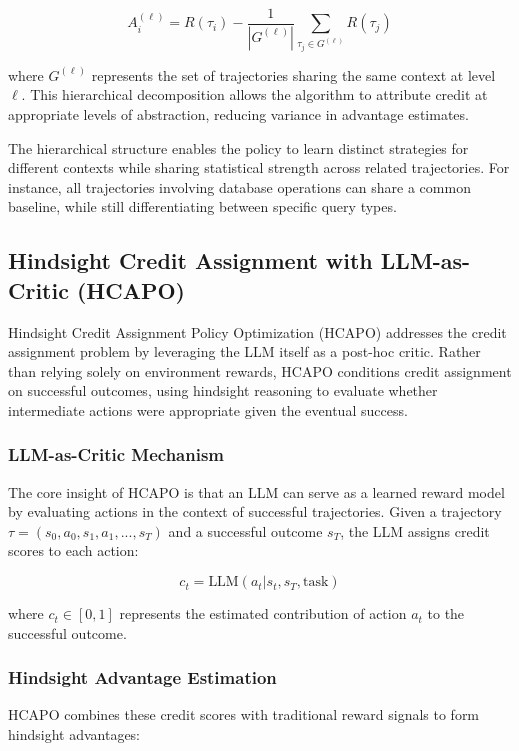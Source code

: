 $$A_i^{(\ell)} = R(\tau_i) - \frac{1}{|G^{(\ell)}|}\sum_{\tau_j \in G^{(\ell)}} R(\tau_j)$$

where $G^{(\ell)}$ represents the set of trajectories sharing the same context at level $\ell$. This hierarchical decomposition allows the algorithm to attribute credit at appropriate levels of abstraction, reducing variance in advantage estimates.

The hierarchical structure enables the policy to learn distinct strategies for different contexts while sharing statistical strength across related trajectories. For instance, all trajectories involving database operations can share a common baseline, while still differentiating between specific query types.

\subsection{Hindsight Credit Assignment with LLM-as-Critic (HCAPO)}

Hindsight Credit Assignment Policy Optimization (HCAPO) addresses the credit assignment problem by leveraging the LLM itself as a post-hoc critic. Rather than relying solely on environment rewards, HCAPO conditions credit assignment on successful outcomes, using hindsight reasoning to evaluate whether intermediate actions were appropriate given the eventual success.

\subsubsection{LLM-as-Critic Mechanism}

The core insight of HCAPO is that an LLM can serve as a learned reward model by evaluating actions in the context of successful trajectories. Given a trajectory $\tau = (s_0, a_0, s_1, a_1, ..., s_T)$ and a successful outcome $s_T$, the LLM assigns credit scores to each action:

$$c_t = \text{LLM}(a_t | s_t, s_T, \text{task})$$

where $c_t \in [0, 1]$ represents the estimated contribution of action $a_t$ to the successful outcome.

\subsubsection{Hindsight Advantage Estimation}

HCAPO combines these credit scores with traditional reward signals to form hindsight advantages:

